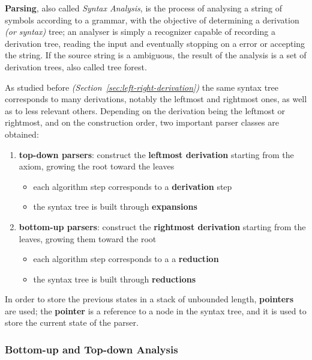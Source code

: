\documentclass[english]{article}
\begin{document}
\textbf{Parsing}, also called \textit{Syntax Analysis}, is the process of analysing a string of symbols according to a grammar, with the objective of determining a derivation \textit{(or syntax)} tree;
an analyser is simply a recognizer capable of recording a derivation tree, reading the input and eventually stopping on a error or accepting the string.
If the source string is a ambiguous, the result of the analysis is a set of derivation trees, also called tree forest.

As studied before \textit{(Section~\ref{sec:left-right-derivation})}
the same syntax tree corresponds to many derivations, notably the leftmost and rightmost ones, as well as to less relevant others.
Depending on the derivation being the leftmost or rightmost, and on the construction order, two important parser classes are obtained:

\begin{enumerate}
  \item \textbf{top-down parsers}: construct the \textbf{leftmost derivation} starting from the axiom, growing the root toward the leaves
        \begin{itemize}
          \item each algorithm step corresponds to a \textbf{derivation} step
          \item the syntax tree is built through \textbf{expansions}
        \end{itemize}
  \item \textbf{bottom-up parsers}: construct the \textbf{rightmost derivation} starting from the leaves, growing them toward the root
        \begin{itemize}
          \item each algorithm step corresponds to a a \textbf{reduction}
          \item the syntax tree is built through \textbf{reductions}
        \end{itemize}
\end{enumerate}

\bigskip
In order to store the previous states in a stack of unbounded length, \textbf{pointers} are used;
the \textbf{pointer} is a reference to a node in the syntax tree, and it is used to store the current state of the parser.

\subsubsection{Bottom-up and Top-down Analysis}
\end{document}
